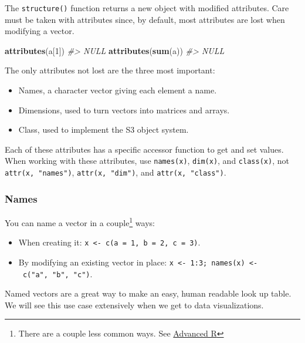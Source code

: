 \documentclass[]{book}
\newenvironment{Shaded}{\begin{snugshade}}{\end{snugshade}}
\newcommand{\CommentTok}[1]{\textcolor[rgb]{0.56,0.35,0.01}{\textit{#1}}}
\newcommand{\DecValTok}[1]{\textcolor[rgb]{0.00,0.00,0.81}{#1}}
\newcommand{\KeywordTok}[1]{\textcolor[rgb]{0.13,0.29,0.53}{\textbf{#1}}}
\newcommand{\NormalTok}[1]{#1}
\let\rmarkdownfootnote\footnote%
\def\footnote{\protect\rmarkdownfootnote}
\theoremstyle{definition}
\theoremstyle{definition}
\theoremstyle{definition}
\theoremstyle{remark}
\begin{document}
The \texttt{structure()} function returns a new object with modified
attributes. Care must be taken with attributes since, by default, most
attributes are lost when modifying a vector.

\begin{Shaded}
\begin{Highlighting}[]
\KeywordTok{attributes}\NormalTok{(a[}\DecValTok{1}\NormalTok{])}
\CommentTok{#> NULL}
\KeywordTok{attributes}\NormalTok{(}\KeywordTok{sum}\NormalTok{(a))}
\CommentTok{#> NULL}
\end{Highlighting}
\end{Shaded}

The only attributes not lost are the three most important:

\begin{itemize}
\item
  Names, a character vector giving each element a name.
\item
  Dimensions, used to turn vectors into matrices and arrays.
\item
  Class, used to implement the S3 object system.
\end{itemize}

Each of these attributes has a specific accessor function to get and set
values. When working with these attributes, use \texttt{names(x)},
\texttt{dim(x)}, and \texttt{class(x)}, not \texttt{attr(x,\ "names")},
\texttt{attr(x,\ "dim")}, and \texttt{attr(x,\ "class")}.

\hypertarget{names}{%
\subsubsection{Names}\label{names}}

You can name a vector in a couple\footnote{There are a couple less
  common ways. See \href{http://adv-r.had.co.nz}{Advanced R}} ways:

\begin{itemize}
\item
  When creating it:
  \texttt{x\ \textless{}-\ c(a\ =\ 1,\ b\ =\ 2,\ c\ =\ 3)}.
\item
  By modifying an existing vector in place:
  \texttt{x\ \textless{}-\ 1:3;\ names(x)\ \textless{}-\ c("a",\ "b",\ "c")}.
\end{itemize}

Named vectors are a great way to make an easy, human readable look up
table. We will see this use case extensively when we get to data
visualizations.
\end{document}
